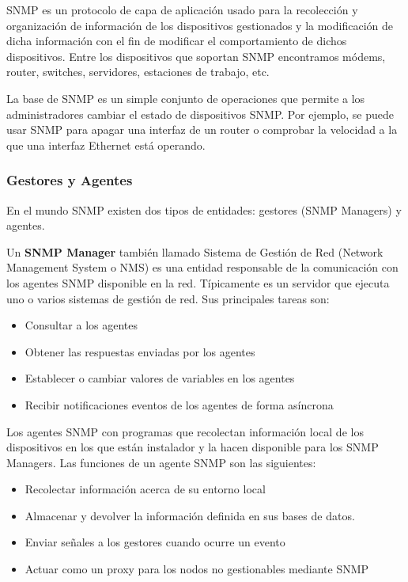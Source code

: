 \gls{SNMP} es un protocolo de capa de aplicación usado para la recolección y organización de
información de los dispositivos gestionados y la modificación de dicha información con el fin de 
modificar el comportamiento de dichos dispositivos. Entre los dispositivos que soportan SNMP 
encontramos módems, router, switches, servidores, estaciones de trabajo, etc.

La base de \gls{SNMP} es un simple conjunto de operaciones que permite a los administradores cambiar el
estado de dispositivos SNMP. Por ejemplo, se puede usar \gls{SNMP} para apagar una interfaz de un router o
comprobar la velocidad a la que una interfaz Ethernet está operando. 

\subsubsection{Gestores y Agentes}

En el mundo \gls{SNMP} existen dos tipos de entidades: gestores (\gls{SNMP} Managers) y agentes. 

Un \textbf{SNMP Manager} también llamado Sistema de Gestión de Red (Network Management System o NMS)
es una entidad responsable de la comunicación con los agentes SNMP disponible en la red. Típicamente
es un servidor que ejecuta uno o varios sistemas de gestión de red. Sus principales tareas son:

\begin{itemize}
    \item Consultar a los agentes
    \item Obtener las respuestas enviadas por los agentes
    \item Establecer o cambiar valores de variables en los agentes
    \item Recibir notificaciones eventos de los agentes de forma asíncrona
\end{itemize}

Los agentes SNMP con programas que recolectan información local de los dispositivos en los que están
instalador y la hacen disponible para los SNMP Managers. Las funciones de un agente SNMP son las
siguientes:

\begin{itemize}
    \item Recolectar información acerca de su entorno local
    \item Almacenar y devolver la información definida en sus bases de datos.
    \item Enviar señales a los gestores cuando ocurre un evento
    \item Actuar como un proxy para los nodos no gestionables mediante SNMP
\end{itemize}

